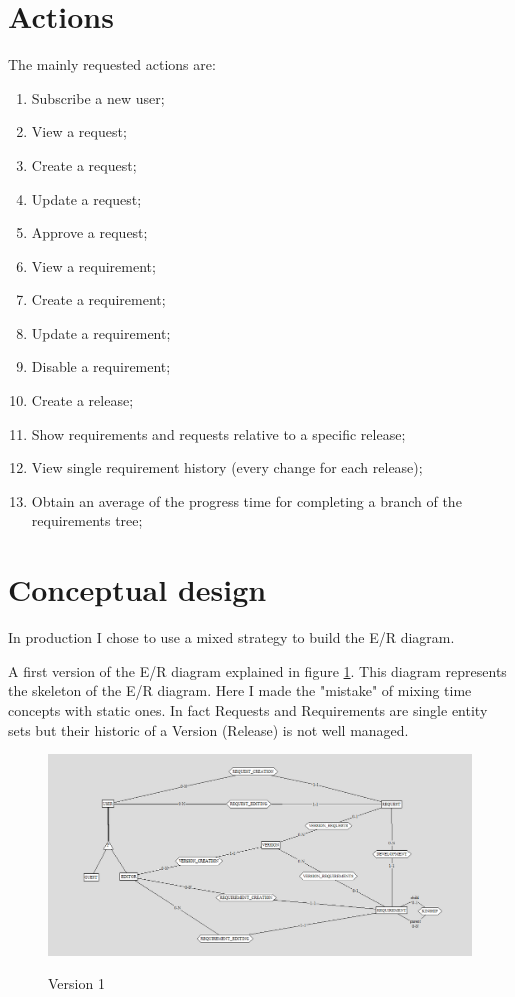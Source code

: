 \documentclass[12pt, a4paper]{report}
\begin{document}
\section*{Actions}

The mainly requested actions are:
\begin{enumerate}
    \item Subscribe a new user;
    \item View a request;
    \item Create a request;
    \item Update a request;
    \item Approve a request;
    \item View a requirement;
    \item Create a requirement;
    \item Update a requirement;
    \item Disable a requirement;
    \item Create a release;
    \item Show requirements and requests relative to a specific release;
    \item View single requirement history (every change for each release);
    \item Obtain an average of the progress time for completing a branch of the requirements tree;
\end{enumerate}

\section*{Conceptual design}

In production I chose to use a mixed strategy to build the E/R diagram.

A first version of the E/R diagram explained in figure \ref{fig:ER_v1}.
This diagram represents the skeleton of the E/R diagram.
Here I made the "mistake" of mixing time concepts with static ones.
In fact Requests and Requirements are single entity sets but their historic of a Version (Release) is not well managed.

\begin{figure}[H]
\centering
\caption{Version 1}
\includegraphics[width=\textwidth]{E-R conceptual v1}
\label{fig:ER_v1}
\end{figure}
\end{document}
